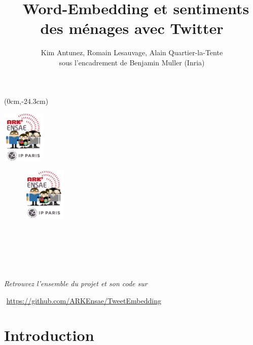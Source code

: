 \documentclass[11pt,french,french]{article}
\title{~Word-Embedding et sentiments des ménages avec Twitter}
\author{Kim Antunez, Romain Lesauvage, Alain Quartier-la-Tente\\
sous l'encadrement de Benjamin Muller (Inria)}
\date{}
\begin{document}
\maketitle


{
\hypersetup{linkcolor=black}
\setcounter{tocdepth}{2}
\tableofcontents
}
\begin{textblock*}{\textwidth}(0cm,-24.3cm)
\begin{center}
\includegraphics[height=2.5cm]{img/LOGO-ENSAE.png}
\end{center}
\end{textblock*}

\newpage

\begin{center}
\begin{minipage}{0.7\textwidth}

\begin{figure}
\includegraphics[height=2.5cm]{img/LOGO-ENSAE.png}
\end{figure}

$\phantom{saut}$

$\phantom{saut}$

$\phantom{saut}$


\emph{Retrouvez l'ensemble du projet et son code sur}

$\phantom{}$%
\url{https://github.com/ARKEnsae/TweetEmbedding}

\end{minipage}
\end{center}

\vspace{0.5cm}

\hypertarget{introduction}{%
\section*{Introduction}\label{introduction}}
\end{document}
